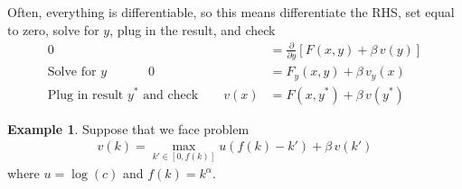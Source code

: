 \documentclass[12pt]{article}
\numberwithin{equation}{section} %
\theoremstyle{plain}
\theoremstyle{definition}
\newtheorem{ex}[thm]{Example}
\theoremstyle{remark}
\begin{document}
Often, everything is differentiable, so this means differentiate the
RHS, set equal to zero, solve for $y$, plug in the result, and check
\begin{align*}
  0 &= \frac{\partial}{\partial y}
  \left[
    F(x,y) + \beta\, v(y)
  \right] \\
  \text{Solve for $y$}
  \quad \qquad \;
  0 &= F_y(x,y) + \beta \, v_y(x) \\
  \text{Plug in result $y^*$ and check} \qquad
  v(x) &= F(x,y^*) + \beta\, v(y^*)
\end{align*}

\begin{ex}
Suppose that we face problem
\begin{align*}
  v(k) = \max_{k'\in[0,f(k)]} u(f(k)-k') + \beta\, v(k')
\end{align*}
where $u=\log(c)$ and $f(k)=k^\alpha$.


\end{ex}
\end{document}
